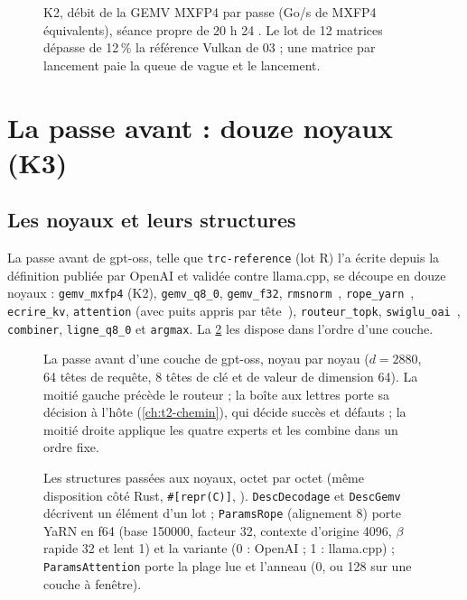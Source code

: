 \begin{figure}[!htbp]
\centering
\GrapheNoyGemv
\caption[K2 : débit de la GEMV MXFP4]{K2, débit de la GEMV MXFP4 par passe (Go/s de MXFP4 équivalents), séance propre de 20 h 24 \mes. Le lot de 12 matrices dépasse de 12\,\% la référence Vulkan de 03 ; une matrice par lancement paie la queue de vague et le lancement.}
\label{fig:t2n-gemv}
\end{figure}

\section{La passe avant : douze noyaux (K3)}\label{sec:t2n-passe}

\subsection{Les noyaux et leurs structures}

La passe avant de gpt-oss, telle que \texttt{trc-reference} (lot R) l'a écrite depuis la définition publiée par OpenAI et validée contre llama.cpp, se découpe en douze noyaux : \texttt{gemv\_mxfp4} (K2), \texttt{gemv\_q8\_0}, \texttt{gemv\_f32}, \texttt{rmsnorm}~\cite{zhang2019rmsnorm}, \texttt{rope\_yarn}~\cite{su2021roformer,peng2023yarn}, \texttt{ecrire\_kv}, \texttt{attention} (avec puits appris par tête~\cite{xiao2024sinks}), \texttt{routeur\_topk}, \texttt{swiglu\_oai}~\cite{shazeer2020glu}, \texttt{combiner}, \texttt{ligne\_q8\_0} et \texttt{argmax}. La \cref{fig:t2n-passe} les dispose dans l'ordre d'une couche.

\begin{figure}[!htbp]
\centering
\resizebox{\linewidth}{!}{\SchemaNoyPasse}
\caption[La passe avant d'une couche, noyau par noyau]{La passe avant d'une couche de gpt-oss, noyau par noyau ($d = \num{2880}$, 64 têtes de requête, 8 têtes de clé et de valeur de dimension 64). La moitié gauche précède le routeur ; la boîte aux lettres porte sa décision à l'hôte (\cref{ch:t2-chemin}), qui décide succès et défauts ; la moitié droite applique les quatre experts et les combine dans un ordre fixe.}
\label{fig:t2n-passe}
\end{figure}

\begin{figure}[!htbp]
\centering
\resizebox{\linewidth}{!}{\SchemaNoyStructures}
\caption[Les structures passées aux noyaux]{Les structures passées aux noyaux, octet par octet (même disposition côté Rust, \texttt{\#[repr(C)]}, ). \texttt{DescDecodage} et \texttt{DescGemv} décrivent un élément d'un lot ; \texttt{ParamsRope} (alignement 8) porte YaRN en f64 (base \num{150000}, facteur 32, contexte d'origine \num{4096}, $\beta$ rapide 32 et lent 1) et la variante (0 : OpenAI ; 1 : llama.cpp) ; \texttt{ParamsAttention} porte la plage lue et l'anneau (0, ou 128 sur une couche à fenêtre).}
\label{fig:t2n-structures}
\end{figure}

